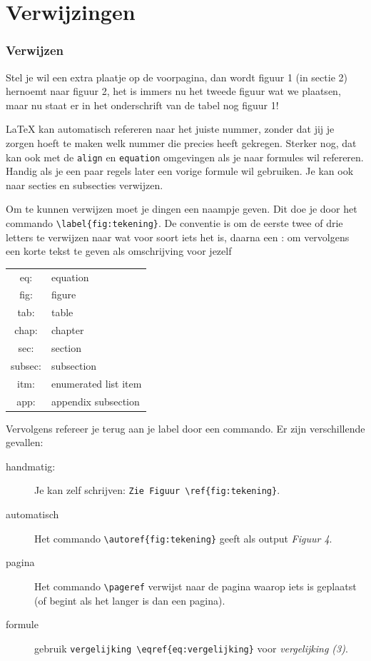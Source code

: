 \documentclass{beamer}
\begin{document}
\section{Verwijzingen}
\begin{frame}[allowframebreaks]
	\frametitle{Verwijzen}
	Stel je wil een extra plaatje op de voorpagina, dan wordt figuur 1 (in sectie 2) hernoemt naar figuur 2, het is immers nu het tweede figuur wat we plaatsen, maar nu staat er in het onderschrift van de tabel nog figuur 1!
	
	\LaTeX{} kan automatisch refereren naar het juiste nummer, zonder dat jij je zorgen hoeft te maken welk nummer die precies heeft gekregen. Sterker nog, dat kan ook met de \texttt{align} en \texttt{equation} omgevingen als je naar formules wil refereren. Handig als je een paar regels later een vorige formule wil gebruiken. Je kan ook naar secties en subsecties verwijzen.
	
	\framebreak
	
	Om te kunnen verwijzen moet je dingen een naampje geven. Dit doe je door het commando \alert{\texttt{\textbackslash label\{fig:tekening\}}}. De conventie is om de eerste twee of drie letters te verwijzen naar wat voor soort iets het is, daarna een : om vervolgens een korte tekst te geven als omschrijving voor jezelf
	
	\begin{table}
		\centering
		\begin{tabular}{c|l}
			eq:&	equation \\ 
			fig:&	figure \\
			tab:&	table \\
			chap: &	chapter \\
			sec:&	section \\
			subsec:&	subsection \\
			itm:&	enumerated list item \\
			app:&	appendix subsection
		\end{tabular}
	\end{table}

	\framebreak
	Vervolgens refereer je terug aan je label door een commando. Er zijn verschillende gevallen:
	\begin{description}
		\item[handmatig:] Je kan zelf schrijven: \texttt{Zie Figuur \textbackslash ref\{fig:tekening\}}.
		\item[automatisch] Het commando \texttt{\textbackslash autoref\{fig:tekening\}} geeft als output \textit{Figuur 4}. 
		\item[pagina]  Het commando \texttt{\textbackslash pageref} verwijst naar de pagina waarop iets is geplaatst (of begint als het langer is dan een pagina).
		\item[formule] gebruik \texttt{vergelijking \textbackslash eqref\{eq:vergelijking\}} voor \textit{vergelijking (3)}.
	\end{description}
\end{frame}
	
\end{document}

